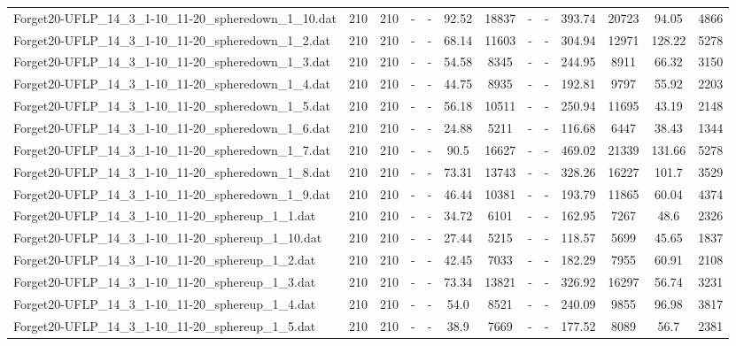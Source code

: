 \begin{table}[!ht]
{\begin{tabular}{lcccccccccccc}
Forget20-UFLP\_14\_3\_1-10\_11-20\_spheredown\_1\_10.dat & 210 & 210 &  - &  - & 92.52 & 18837 &  - &  - & 393.74 & 20723 & 94.05 & 4866 \\
Forget20-UFLP\_14\_3\_1-10\_11-20\_spheredown\_1\_2.dat & 210 & 210 &  - &  - & 68.14 & 11603 &  - &  - & 304.94 & 12971 & 128.22 & 5278 \\
Forget20-UFLP\_14\_3\_1-10\_11-20\_spheredown\_1\_3.dat & 210 & 210 &  - &  - & 54.58 & 8345 &  - &  - & 244.95 & 8911 & 66.32 & 3150 \\
Forget20-UFLP\_14\_3\_1-10\_11-20\_spheredown\_1\_4.dat & 210 & 210 &  - &  - & 44.75 & 8935 &  - &  - & 192.81 & 9797 & 55.92 & 2203 \\
Forget20-UFLP\_14\_3\_1-10\_11-20\_spheredown\_1\_5.dat & 210 & 210 &  - &  - & 56.18 & 10511 &  - &  - & 250.94 & 11695 & 43.19 & 2148 \\
Forget20-UFLP\_14\_3\_1-10\_11-20\_spheredown\_1\_6.dat & 210 & 210 &  - &  - & 24.88 & 5211 &  - &  - & 116.68 & 6447 & 38.43 & 1344 \\
Forget20-UFLP\_14\_3\_1-10\_11-20\_spheredown\_1\_7.dat & 210 & 210 &  - &  - & 90.5 & 16627 &  - &  - & 469.02 & 21339 & 131.66 & 5278 \\
Forget20-UFLP\_14\_3\_1-10\_11-20\_spheredown\_1\_8.dat & 210 & 210 &  - &  - & 73.31 & 13743 &  - &  - & 328.26 & 16227 & 101.7 & 3529 \\
Forget20-UFLP\_14\_3\_1-10\_11-20\_spheredown\_1\_9.dat & 210 & 210 &  - &  - & 46.44 & 10381 &  - &  - & 193.79 & 11865 & 60.04 & 4374 \\
Forget20-UFLP\_14\_3\_1-10\_11-20\_sphereup\_1\_1.dat & 210 & 210 &  - &  - & 34.72 & 6101 &  - &  - & 162.95 & 7267 & 48.6 & 2326 \\
Forget20-UFLP\_14\_3\_1-10\_11-20\_sphereup\_1\_10.dat & 210 & 210 &  - &  - & 27.44 & 5215 &  - &  - & 118.57 & 5699 & 45.65 & 1837 \\
Forget20-UFLP\_14\_3\_1-10\_11-20\_sphereup\_1\_2.dat & 210 & 210 &  - &  - & 42.45 & 7033 &  - &  - & 182.29 & 7955 & 60.91 & 2108 \\
Forget20-UFLP\_14\_3\_1-10\_11-20\_sphereup\_1\_3.dat & 210 & 210 &  - &  - & 73.34 & 13821 &  - &  - & 326.92 & 16297 & 56.74 & 3231 \\
Forget20-UFLP\_14\_3\_1-10\_11-20\_sphereup\_1\_4.dat & 210 & 210 &  - &  - & 54.0 & 8521 &  - &  - & 240.09 & 9855 & 96.98 & 3817 \\
Forget20-UFLP\_14\_3\_1-10\_11-20\_sphereup\_1\_5.dat & 210 & 210 &  - &  - & 38.9 & 7669 &  - &  - & 177.52 & 8089 & 56.7 & 2381 \\

\end{tabular}}
\end{table}
